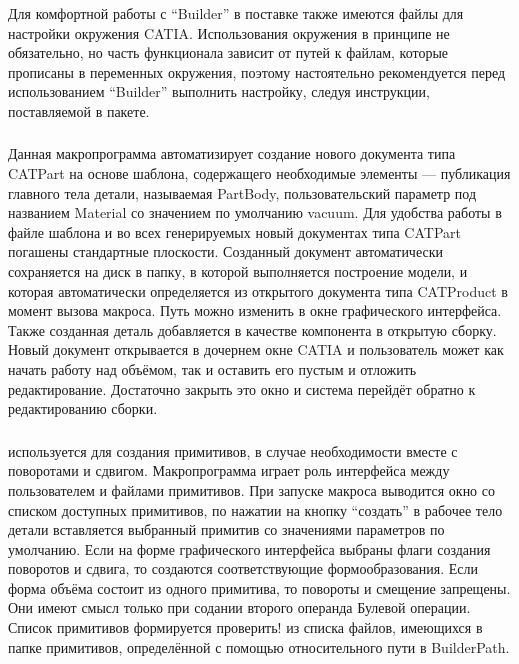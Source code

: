 Для комфортной работы с ``Builder'' в поставке также имеются файлы для настройки окружения CATIA. Использования окружения в принципе не обязательно, но часть функционала зависит от путей к файлам, которые прописаны в переменных окружения, поэтому настоятельно рекомендуется перед использованием ``Builder'' выполнить настройку, следуя инструкции, поставляемой в пакете.

\subsubsection{}\label{sec:AddNewPart}

Данная макропрограмма автоматизирует создание нового документа типа CATPart на основе шаблона, содержащего необходимые элементы --- публикация главного тела детали, называемая PartBody, пользовательский параметр под названием Material со значением по умолчанию vacuum. Для удобства работы в файле шаблона и во всех генерируемых новый документах типа CATPart погашены стандартные плоскости. Созданный документ автоматически сохраняется на диск в папку, в которой выполняется построение модели, и которая автоматически определяется из открытого документа типа CATProduct в момент вызова макроса. Путь можно изменить в окне графического интерфейса. Также созданная деталь добавляется в качестве компонента в открытую сборку. Новый документ открывается в дочернем окне CATIA и пользователь может как начать работу над объёмом, так и оставить его пустым и отложить редактирование. Достаточно закрыть это окно и система перейдёт обратно к редактированию сборки.

\subsubsection{}\label{sec:AddShape}

 используется для создания примитивов, в случае необходимости вместе с поворотами и сдвигом. Макропрограмма играет роль интерфейса между пользователем и файлами примитивов. При запуске макроса выводится окно со списком доступных примитивов, по нажатии на кнопку ``создать'' в рабочее тело детали вставляется выбранный примитив со значениями параметров по умолчанию. Если на форме графического интерфейса выбраны флаги создания поворотов и сдвига, то создаются соответствующие формообразования. Если форма объёма состоит из одного примитива, то повороты и смещение запрещены. Они имеют смысл только при содании второго операнда Булевой операции. Список примитивов формируется \todo проверить! \todo из списка файлов, имеющихся в папке примитивов, определённой с помощью относительного пути в BuilderPath.

